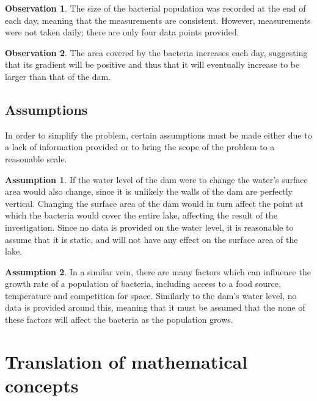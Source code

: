 \documentclass[a4paper]{article}
\theoremstyle{definition}
\newtheorem{assumption}{Assumption}
\newtheorem{observation}{Observation}
\begin{document}
        \begin{observation}
            The size of the bacterial population was recorded at the end of each day, meaning that the measurements are consistent. However, measurements were not taken daily; there are only four data points provided.
        \end{observation}

        \begin{observation}
            The area covered by the bacteria increases each day, suggesting that its gradient will be positive and thus that it will eventually increase to be larger than that of the dam.
        \end{observation}
    
    \subsection{Assumptions}
    
        In order to simplify the problem, certain assumptions must be made either due to a lack of information provided or to bring the scope of the problem to a reasonable scale.

        \begin{assumption}
            If the water level of the dam were to change the water's surface area would also change, since it is unlikely the walls of the dam are perfectly vertical. Changing the surface area of the dam would in turn affect the point at which the bacteria would cover the entire lake, affecting the result of the investigation. Since no data is provided on the water level, it is reasonable to assume that it is static, and will not have any effect on the surface area of the lake.
        \end{assumption}

        \begin{assumption} \label{asmptnBacteriaGrowth}
            In a similar vein, there are many factors which can influence the growth rate of a population of bacteria, including access to a food source, temperature and competition for space. Similarly to the dam's water level, no data is provided around this, meaning that it must be assumed that the none of these factors will affect the bacteria as the population grows.
        \end{assumption}
        
\section{Translation of mathematical concepts}
    
\end{document}
